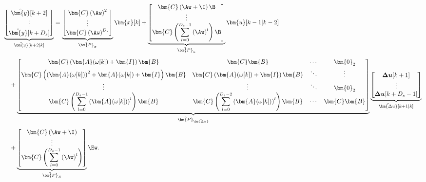 \begin{equation}
	\begin{aligned}
		&\underbrace{
			\begin{bmatrix}
				\hat{\bm{y}}[k+2] \\
				\vdots \\
				\hat{\bm{y}}[k+D_s]
			\end{bmatrix}
		}_{\Bar{\bm{y}}[k+2|k]}
		=
		\underbrace{
			\begin{bmatrix}
				\bm{C}\left(\Aw\right)^2 \\
				\vdots \\
				\bm{C}\left(\Aw\right)^{D_s}
			\end{bmatrix}
		}_{\Tilde{\bm{P}}_x}
		{\bm{x}}[k]
		+
		\underbrace{
			\begin{bmatrix}
				\bm{C}\left(\Aw+\I\right)\B \\
				\vdots \\
				\bm{C}\left(\displaystyle\sum_{l=0}^{D_s-1}
				\left(\Aw\right)^l\right)\B
			\end{bmatrix}
		}_{\Tilde{\bm{P}}_u}
		\bm{u}[k-1|k-2]
		\\[1ex]
		&\quad+
		\underbrace{
			\begin{bmatrix}
				\bm{C}\left(\bm{A}(\omega[k])+\bm{I}\right)\bm{B}
				&
				\bm{C}\bm{B}
				&
				\cdots
				&
				\bm{0}_2
				\\[0.5ex]
				\bm{C}\left(
				\left(\bm{A}(\omega[k])\right)^2
				+\bm{A}(\omega[k])
				+\bm{I}
				\right)\bm{B}
				&
				\bm{C}\left(\bm{A}(\omega[k])+\bm{I}\right)\bm{B}
				&
				\ddots
				&
				\vdots
				\\
				\vdots
				&
				\vdots
				&
				\ddots
				&
				\bm{0}_2
				\\
				\bm{C}\left(
				\displaystyle\sum_{l=0}^{D_s-1}
				\left(\bm{A}(\omega[k])\right)^l
				\right)\bm{B}
				&
				\bm{C}\left(
				\displaystyle\sum_{l=0}^{D_s-2}
				\left(\bm{A}(\omega[k])\right)^l
				\right)\bm{B}
				&
				\cdots
				&
				\bm{C}\bm{B}
			\end{bmatrix}
		}_{\Tilde{\bm{P}}_{\Bar{\bm{\Delta u}}}}
		\underbrace{
			\begin{bmatrix}
				\boldsymbol{\Delta u}[k+1] \\
				\vdots \\
				\boldsymbol{\Delta u}[k+D_s-1]
			\end{bmatrix}
		}_{\Bar{\bm{\Delta u}}[k+1|k]}
		\\[1ex]
		&\quad+
		\underbrace{
			\begin{bmatrix}
				\bm{C}\left(\Aw+\I\right) \\
				\vdots \\
				\bm{C}\left(
				\displaystyle\sum_{l=0}^{D_s-1}
				\left(\Aw\right)^l
				\right)
			\end{bmatrix}
		}_{\Tilde{\bm{P}}_E}
		\Ew .
	\end{aligned}
	\label{equ:prediction_full_dtc}
\end{equation}